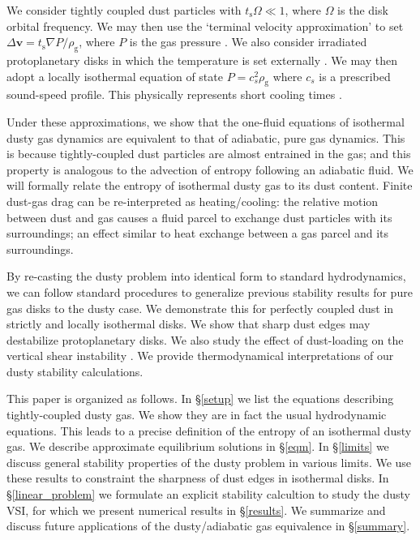 \documentclass[iop, numberedappendix]{emulateapj}
\newcommand{\rhog}{\rho_\mathrm{g}}
\newcommand{\tstop}{t_\mathrm{s}}
\begin{document}
We consider tightly coupled dust particles with $\tstop\Omega\ll
1$, where $\Omega$ is the disk orbital frequency. We may then use the
`terminal velocity approximation' to set $\Delta \bm{v} = \tstop\nabla
P/\rhog$, where $P$ is the gas pressure \citep{youdin05a,
  jacquet11,laibe14}. We also consider irradiated protoplanetary disks 
in which the temperature is set externally \citep{chiang97,stam08}. We
may then adopt a locally isothermal equation of state $P = c_s^2\rhog$
where $c_s$ is a prescribed sound-speed profile.  This physically
represents short cooling times \citep{lin15}. 

Under these approximations, we show that the one-fluid equations of 
isothermal dusty gas dynamics are equivalent to that of adiabatic, pure gas
dynamics. This is because tightly-coupled dust particles are almost
entrained in the gas; and this property is analogous to the advection
of entropy following an adiabatic fluid. We will formally relate the
entropy of isothermal dusty gas to its dust content. Finite 
dust-gas drag can be re-interpreted as heating/cooling: the relative
motion between dust and gas causes a fluid parcel to exchange dust
particles with its surroundings; an effect similar to heat exchange
between a gas parcel and its surroundings.   


By re-casting the dusty problem into identical form to standard
hydrodynamics, we can follow standard procedures to generalize previous stability 
results for pure gas disks to the dusty case. We demonstrate this for
perfectly coupled dust in strictly and locally isothermal disks. We
show that sharp dust edges may destabilize protoplanetary disks.  
We also study the effect of dust-loading on the vertical shear
instability \citep[VSI,][]{nelson13,lin15,barker15}. We provide 
thermodynamical interpretations of our dusty stability calculations. 

This paper is organized as follows. In \S\ref{setup} we list the
equations describing tightly-coupled dusty gas. We show they are in 
fact the usual hydrodynamic equations. This leads to a precise 
definition of the entropy of an isothermal dusty gas. We describe approximate 
equilibrium solutions in \S\ref{eqm}. In \S\ref{limits} we discuss
general stability properties of the dusty problem in various
limits. We use these results to constraint the sharpness of dust edges
in isothermal disks. In \S\ref{linear_problem} we formulate an
explicit stability calcultion to study the dusty VSI, for which we
present numerical results in \S\ref{results}. We summarize and discuss
future applications of the dusty/adiabatic gas equivalence in
\S\ref{summary}. 









\appendix




\end{document}
